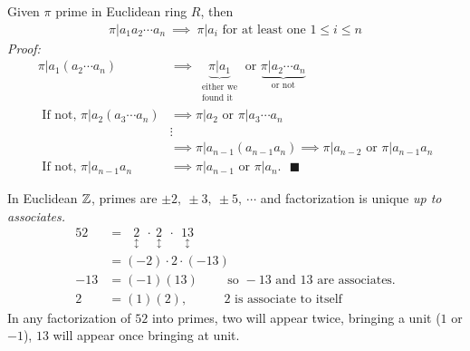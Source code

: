 \begin{corollary}
    Given $\pi$ prime in Euclidean ring $R$, then 
    \begin{align*}
        \pi | a_1 a_2 \cdots a_n \ \implies \ \pi | a_i \text{ for at least one } 1\leq i \leq n 
    \end{align*}
    \textit{Proof: } 
    \begin{align*}
        \pi | a_1 (a_2 \cdots a_n) \ &\implies \ \underbrace{\pi |a_1}_{\substack{\text{either we}\\ \text{found it}}} \text{ or  } \underbrace{\pi | a_2 \cdots a_n}_{\text{or not}}\\
        \text{ If not, }\pi | a_2 (a_3 \cdots a_n) &\implies \pi | a_2 \text{ or }\pi | a_3 \cdots a_n \\
        &\vdots \\
        &\implies \pi |a_{n-1}(a_{n-1}a_n) \implies \pi|a_{n-2} \text{ or }\pi | a_{n-1}a_n \\
        \text{ If not, } \pi |a_{n-1}a_n &\implies \pi | a_{n-1} \text{ or }\pi | a_n. \ \ \ \blacksquare 
    \end{align*}
\end{corollary}

In Euclidean ${\mathbb{ Z}}$, primes are $\pm 2, \ \pm 3, \ \pm 5, \ \cdots $ and factorization is unique \textit{up to associates.}
\begin{align*}
    52&= \ \ \ \underset{\updownarrow}{2} \ \ \cdot \ \underset{\updownarrow}{2} \ \ \cdot \ \ \underset{\updownarrow}{13} \\
    &= (-2)\cdot 2 \cdot (-13) \\
    -13&= (-1)(13) \ \ \ \ \ \ \ \ \ \text{ so }-13 \text{ and }13 \text{ are associates.} \\
    2&=(1)(2), \ \ \ \ \ \ \ \ \ \ \ \ \ 2 \text{ is associate to itself}
\end{align*}
In any factorization of $52$ into primes, two will appear twice, bringing a unit ($1$ or $-1$), $13$ will appear once bringing at unit. \\ \steezybreak
